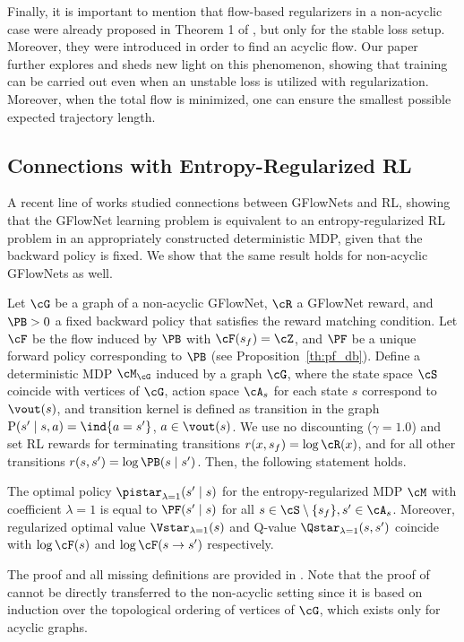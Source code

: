 Finally, it is important to mention that flow-based regularizers in a non-acyclic case were already proposed in Theorem 1 of \cite{brunswic2024theory}, but only for the stable loss setup. Moreover, they were introduced in order to find an acyclic flow. Our paper further explores and sheds new light on this phenomenon, showing that training can be carried out even when an unstable loss is utilized with regularization. Moreover, when the total flow is minimized, one can ensure the smallest possible expected trajectory length.

\subsection{Connections with Entropy-Regularized RL}
A recent line of works \cite{tiapkin2024generative,deleu2024discrete} studied connections between GFlowNets and RL, showing that the GFlowNet learning problem is equivalent to an entropy-regularized RL~\cite{neu2017unified, geist2019theory} problem in an appropriately constructed deterministic MDP, given that the backward policy is fixed. We show that the same result holds for non-acyclic GFlowNets as well. 

Let $\cG$ be a graph of a non-acyclic GFlowNet, $\cR$ a GFlowNet reward, and $\PB > 0$ a fixed backward policy that satisfies the reward matching condition. Let $\cF$ be the flow induced by $\PB$ with $\cF(s_f) = \cZ$, and $\PF$ be a unique forward policy corresponding to $\PB$ (see Proposition~\ref{th:pf_db}). Define a deterministic MDP $\cM_{\cG}$ induced by a graph $\cG$, where the state space $\cS$ coincide with vertices of $\cG$, action space $\cA_s$ for each state $s$ correspond to $\vout(s)$, and transition kernel is defined as transition in the graph $\text{P}(s' \mid s, a) = \ind\{a = s'\}$, $a \in \vout(s)$. We use no discounting ($\gamma = 1.0$) and set RL rewards for terminating transitions $r(x, s_f) = \log \cR(x)$, and for all other transitions $r(s, s') = \log \PB(s \mid s')$. Then, the following statement holds.

\begin{theorem}\label{th:rl_reduction}
    The optimal policy $\pistar_{\lambda=1}(s' \mid s)$ for the entropy-regularized MDP $\cM$ with coefficient $\lambda=1$ is equal to $\PF(s' \mid s)$ for all $s \in \cS \setminus \{ s_f \}, s' \in \cA_s$. Moreover, regularized optimal value $\Vstar_{\lambda=1}(s)$ and Q-value $\Qstar_{\lambda=1}(s,s')$ coincide with $\log \cF(s)$ and $\log \cF(s \to s')$ respectively.
\end{theorem}
The proof and all missing definitions are provided in . Note that the proof of \cite{tiapkin2024generative} cannot be directly transferred to the non-acyclic setting since it is based on induction over the topological ordering of vertices of $\cG$, which exists only for acyclic graphs. 
